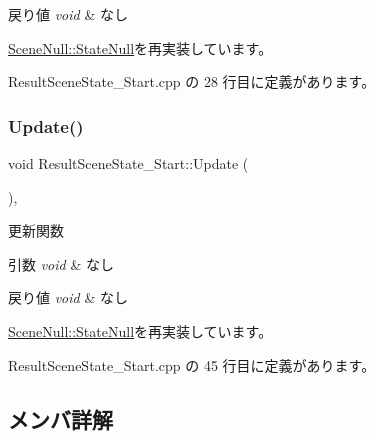 \begin{DoxyRetVals}{戻り値}
{\em void} & なし \\
\hline
\end{DoxyRetVals}


\mbox{\hyperlink{class_scene_null_1_1_state_null_ac0b3f1adf01b580144337e37a847131f}{Scene\+Null\+::\+State\+Null}}を再実装しています。



 Result\+Scene\+State\+\_\+\+Start.\+cpp の 28 行目に定義があります。

\mbox{\label{class_result_scene_state___start_a2ecdef2bef0cd1a04055e8687e11199b}} 
\subsubsection{\texorpdfstring{Update()}{Update()}}
{\footnotesize\ttfamily void Result\+Scene\+State\+\_\+\+Start\+::\+Update (\begin{DoxyParamCaption}{ }\end{DoxyParamCaption})\hspace{0.3cm}{\ttfamily [override]}, {\ttfamily [virtual]}}



更新関数 


\begin{DoxyParams}{引数}
{\em void} & なし \\
\hline
\end{DoxyParams}

\begin{DoxyRetVals}{戻り値}
{\em void} & なし \\
\hline
\end{DoxyRetVals}


\mbox{\hyperlink{class_scene_null_1_1_state_null_a835f82c22afb290eca79460450088baf}{Scene\+Null\+::\+State\+Null}}を再実装しています。



 Result\+Scene\+State\+\_\+\+Start.\+cpp の 45 行目に定義があります。



\subsection{メンバ詳解}
\mbox{\label{class_result_scene_state___start_a223a52e93231e460dad3401a1a49931d}} 
